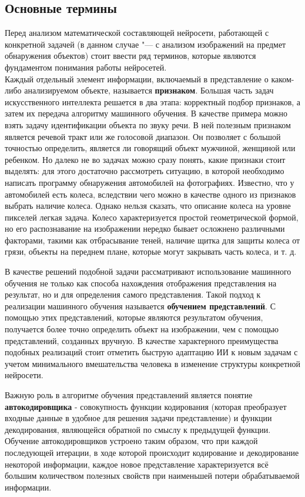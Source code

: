 \documentclass[bachelor, och, coursework]{SCWorks}
\begin{document}
    \subsection{Основные термины}
        Перед анализом математической составляющей нейросети, работающей с конкретной задачей (в данном случае "--- с анализом изображений на предмет обнаружения объектов) стоит ввести ряд терминов, которые являются фундаментом понимания работы нейросетей.\\
        Каждый отдельный элемент информации, включаемый в представление о каком-либо анализируемом объекте, называется \textbf{признаком}. Большая часть задач искусственного интеллекта решается в два этапа: корректный подбор признаков, а затем их передача алгоритму машинного обучения. В качестве примера можно взять задачу идентификации объекта по звуку речи. В ней полезным признаком является речевой тракт или же голосовой диапазон. Он
        позволяет с большой точностью определить, является ли говорящий объект мужчиной, женщиной или
        ребенком.
        Но далеко не во задачах можно сразу понять, какие признаки стоит выделять: для этого достаточно рассмотреть ситуацию, в которой необходимо написать программу обнаружения автомобилей на фотографиях. Известно, что у автомобилей есть колеса, вследствии чего можно в качестве одного из признаков выбрать наличие колеса. Однако нельзя сказать, что описание колеса на уровне пикселей легкая задача.
        Колесо характеризуется простой геометрической формой, но его распознавание на изображении
        нередко бывает осложнено различными факторами, такими как отбрасывание теней, наличие щитка для защиты колеса от грязи, объекты на переднем плане, которые могут закрывать часть колеса, и т. д.

        В качестве решений подобной задачи рассматривают использование машинного обучения не только как способа нахождения отображения представления на результат, но и для определения самого представления. Такой подход к реализации машинного обучения называется \textbf{обучением представлений}. С помощью этих представлений, которые являются результатом обучения, получается более точно определить объект на изображении, чем с помощью представлений, созданных вручную. В качестве характерного преимущества подобных реализаций стоит отметить быструю адаптацию ИИ к новым задачам с учетом минимального вмешательства человека в изменение структуры конкретной нейросети. 

        Важную роль в алгоритме обучения представлений является понятие \textbf{автокодировщика} - совокупность функции кодирования (которая преобразует входные данные в удобное для решения задачи представление) и функции декодирования, являющейся обратной по смыслу к предыдущей функции. Обучение автокодировщиков устроено таким образом, что при каждой последующей итерации, в ходе которой происходит кодирование и декодирование некоторой информации, каждое новое представление характеризуется всё большим количеством полезных свойств при наименьшей потери обрабатываемой информации.
\end{document}
